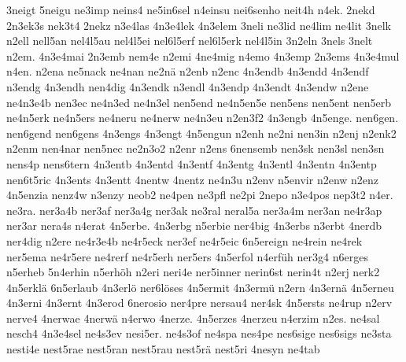 {    3neigt
    5neigu
    ne3imp
    neins4
    ne5in6sel
    n4einsu
    nei6senho
    neit4h
    n4ek.
    2nekd
    2n3ek3s
    nek3t4
    2nekz
    n3e4las
    4n3e4lek
    4n3elem
    3neli
    ne3lid
    ne4lim
    ne4lit
    3nelk
    n2ell
    nell5an
    nel4l5au
    nel4l5ei
    nel6l5erf
    nel6l5erk
    nel4l5in
    3n2eln
    3nels
    3nelt
    n2em.
    4n3e4mai
    2n3emb
    nem4e
    n2emi
    4ne4mig
    n4emo
    4n3emp
    2n3ems
    4n3e4mul
    n4en.
    n2ena
    ne5nack
    ne4nan
    ne2nä
    n2enb
    n2enc
    4n3endb
    4n3endd
    4n3endf
    n3endg
    4n3endh
    nen4dig
    4n3endk
    n3endl
    4n3endp
    4n3endt
    4n3endw
    n2ene
    ne4n3e4b
    nen3ec
    ne4n3ed
    ne4n3el
    nen5end
    ne4n5en5e
    nen5ens
    nen5ent
    nen5erb
    ne4n5erk
    ne4n5ers
    ne4neru
    ne4nerw
    ne4n3eu
    n2en3f2
    4n3engb
    4n5enge.
    nen6gen.
    nen6gend
    nen6gens
    4n3engs
    4n3engt
    4n5engun
    n2enh
    ne2ni
    nen3in
    n2enj
    n2enk2
    n2enm
    nen4nar
    nen5nec
    ne2n3o2
    n2enr
    n2ens
    6nensemb
    nen3sk
    nen3sl
    nen3sn
    nens4p
    nens6tern
    4n3entb
    4n3entd
    4n3entf
    4n3entg
    4n3entl
    4n3entn
    4n3entp
    nen6t5ric
    4n3ents
    4n3entt
    4nentw
    4nentz
    ne4n3u
    n2env
    n5envir
    n2enw
    n2enz
    4n5enzia
    nenz4w
    n3enzy
    neob2
    ne4pen
    ne3pfl
    ne2pi
    2nepo
    n3e4pos
    nep3t2
    n4er.
    ne3ra.
    ner3a4b
    ner3af
    ner3a4g
    ner3ak
    ne3ral
    neral5a
    ner3a4m
    ner3an
    ne4r3ap
    ner3ar
    nera4s
    n4erat
    4n5erbe.
    4n3erbg
    n5erbie
    ner4big
    4n3erbs
    n3erbt
    4nerdb
    ner4dig
    n2ere
    ne4r3e4b
    ne4r5eck
    ner3ef
    ne4r5eic
    6n5ereign
    ne4rein
    ne4rek
    ner5ema
    ne4r5ere
    ne4rerf
    ne4r5erh
    ner5ers
    4n5erfol
    n4erfüh
    ner3g4
    n6erges
    n5erheb
    5n4erhin
    n5erhöh
    n2eri
    neri4e
    ner5inner
    nerin6st
    nerin4t
    n2erj
    nerk2
    4n5erklä
    6n5erlaub
    4n3erlö
    ner6löses
    4n5ermit
    4n3ermü
    n2ern
    4n3ernä
    4n5erneu
    4n3erni
    4n3ernt
    4n3erod
    6nerosio
    ner4pre
    nersau4
    ner4sk
    4n5ersts
    ne4rup
    n2erv
    nerve4
    4nerwae
    4nerwä
    n4erwo
    4nerze.
    4n5erzes
    4nerzeu
    n4erzim
    n2es.
    ne4sal
    nesch4
    4n3e4sel
    ne4s3ev
    nesi5er.
    ne4s3of
    ne4spa
    nes4pe
    nes6sige
    nes6sigs
    ne3sta
    nesti4e
    nest5rae
    nest5ran
    nest5rau
    nest5rä
    nest5ri
    4nesyn
    ne4tab
}
